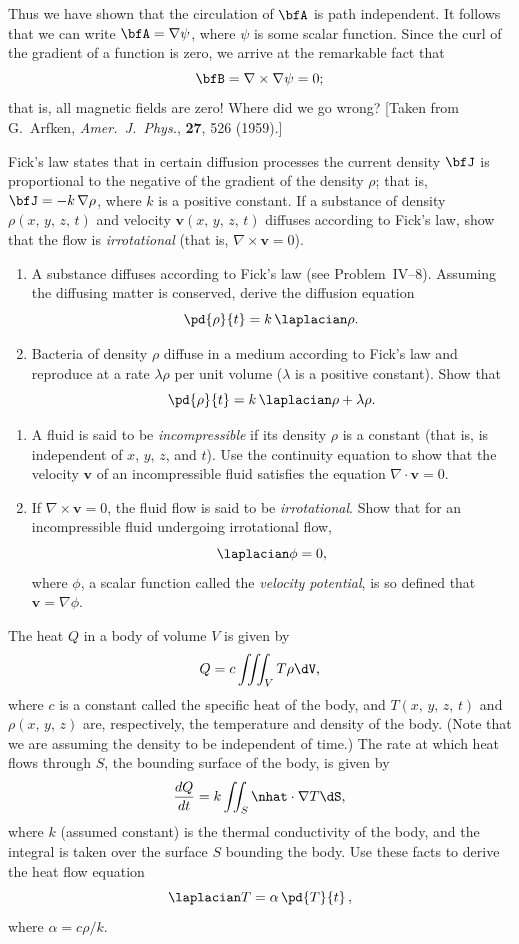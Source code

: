 \begin{problems}
Thus we have shown that the circulation of $\bfA$ is path
independent.  It follows that we can write
$\bfA = \nabla\psi$, where $\psi$ is some scalar function.  Since
the curl of the gradient of a function is zero, we arrive at the
remarkable fact that
\[
\bfB = \nabla\times\nabla\psi = 0;
\]
that is, all magnetic fields are zero!  Where did we go wrong?
[Taken from G.~Arfken, \emph{Amer.\ J.\ Phys.}, \textbf{27}, 526
(1959).]

\prob
Fick's law states that in certain diffusion processes the current
density $\bfJ$ is proportional to the negative of the gradient of the
density $\rho$; that is, $\bfJ = -k\,\nabla\rho$, where $k$ is a
positive constant.  If a substance of density $\rho(x,\,y,\,z,\,t)$
and velocity $\mathbf{v}(x,\,y,\,z,\,t)$ diffuses according to Fick's
law, show that the flow is \emph{irrotational} (that is,
$\nabla\times\mathbf{v} = 0$).

\prob
\begin{enumerate}[label=(\alph*)]
\item A substance diffuses according to Fick's law (see
  Problem~IV--8).  Assuming the diffusing matter is conserved, derive
  the diffusion equation
  \[
  \pd{\rho}{t} = k\,\laplacian\rho.
  \]

\item Bacteria of density $\rho$ diffuse in a medium according to
  Fick's law and reproduce at a rate $\lambda\rho$ per unit volume
  ($\lambda$ is a positive constant).  Show that
  \[
  \pd{\rho}{t} = k\,\laplacian\rho + \lambda\rho.
  \]
\end{enumerate}

\prob
\begin{enumerate}[label=(\alph*)]
\item A fluid is said to be \emph{incompressible} if its density
  $\rho$ is a constant (that is, is independent of $x$, $y$, $z$, and
  $t$).  Use the continuity equation to show that the velocity
  $\mathbf{v}$ of an incompressible fluid satisfies the equation
  $\nabla\cdot\mathbf{v} = 0$.

\item If $\nabla\times\mathbf{v} = 0$, the fluid flow is said to be
  \emph{irrotational}.  Show that for an incompressible fluid
  undergoing irrotational flow,
  \[
  \laplacian\phi = 0,
  \]
  where $\phi$, a scalar function called the \emph{velocity
  potential}, is so defined that $\mathbf{v} = \nabla\phi$.
\end{enumerate}

\prob
The heat $Q$ in a body of volume $V$ is given by
\[
Q = c\iiint_V T\rho\dV,
\]
where $c$ is a constant called the specific heat of the body, and
$T(x,\,y,\,z,\,t)$ and $\rho(x,\,y,\,z)$ are, respectively, the
temperature and density of the body.  (Note that we are assuming the
density to be independent of time.)  The rate at which heat flows
through $S$, the bounding surface of the body, is given by
\[
\frac{dQ}{dt} = k\iint_S \nhat\cdot\nabla T\dS,
\]
where $k$ (assumed constant) is the thermal conductivity of the
body, and the integral is taken over the surface $S$ bounding the
body.  Use these facts to derive the heat flow equation
\[
\laplacian T = \alpha\,\pd{T}{t}\,,
\]
where $\alpha = c\rho/k$.


\end{problems}
